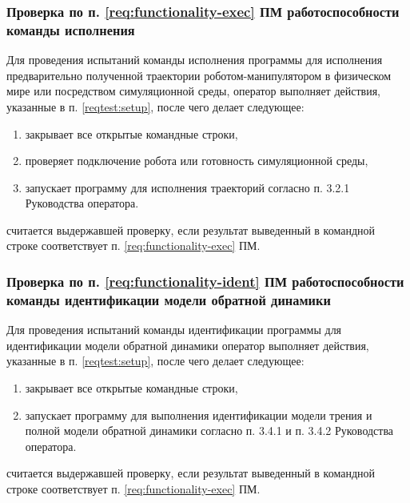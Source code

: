 \subsubsection{Проверка по п. \ref{req:functionality-exec} ПМ работоспособности команды исполнения} \label{reqtest:functionality-exec}
Для проведения испытаний команды исполнения программы \productnamesecond для исполнения предварительно полученной траектории роботом-манипулятором в физическом мире или посредством симуляционной среды, оператор выполняет действия, указанные в п. \ref{reqtest:setup}, после чего делает следующее:
\begin{enumerate}
    \item закрывает все открытые командные строки,
    \item проверяет подключение робота или готовность симуляционной среды,
    \item запускает программу для исполнения траекторий согласно п. 3.2.1 Руководства оператора.
\end{enumerate}
\programname считается выдержавшей проверку, если результат выведенный в командной строке соответствует п. \ref{req:functionality-exec} ПМ.

\subsubsection{Проверка по п. \ref{req:functionality-ident} ПМ  работоспособности команды идентификации модели обратной динамики} \label{reqtest:functionality-ident}
Для проведения испытаний команды идентификации программы \productnamesecond для идентификации модели обратной динамики оператор выполняет действия, указанные в п. \ref{reqtest:setup}, после чего делает следующее:
\begin{enumerate}
    \item закрывает все открытые командные строки,
    \item запускает программу для выполнения идентификации модели трения и полной модели обратной динамики согласно п. 3.4.1 и п. 3.4.2 Руководства оператора.
\end{enumerate}
\programname считается выдержавшей проверку, если результат выведенный в командной строке соответствует п. \ref{req:functionality-exec} ПМ.


